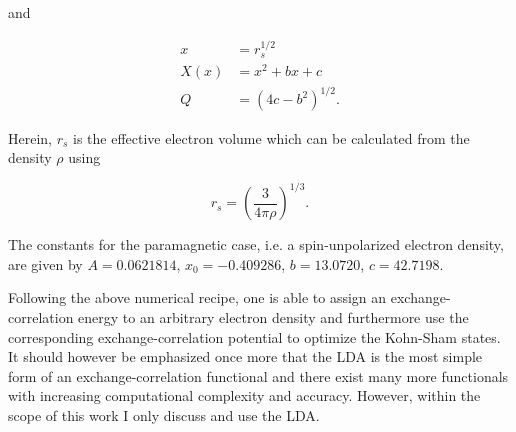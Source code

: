 and

\begin{align}
	x &= r_{s}^{1/2} \\
	X(x) &= x^{2} + bx + c \\
	Q &= \left(4c - b^{2}\right)^{1/2}.
\end{align}

Herein, $r_{s}$ is the effective electron volume which can be calculated from the density $\rho$ using

\begin{equation}
	r_{s} = \left( \dfrac{3}{4 \pi \rho} \right)^{1/3}.
\end{equation}

The constants for the paramagnetic case, i.e. a spin-unpolarized electron density, are given by $A = 0.0621814$, $x_{0} = -0.409286$, $b = 13.0720$, $c = 42.7198$.

Following the above numerical recipe, one is able to assign an exchange-correlation energy to an arbitrary electron density and furthermore use the corresponding exchange-correlation potential to optimize the Kohn-Sham states. It should however be emphasized once more that the LDA is the most simple form of an exchange-correlation functional and there exist many more functionals with increasing computational complexity and accuracy. However, within the scope of this work I only discuss and use the LDA.
